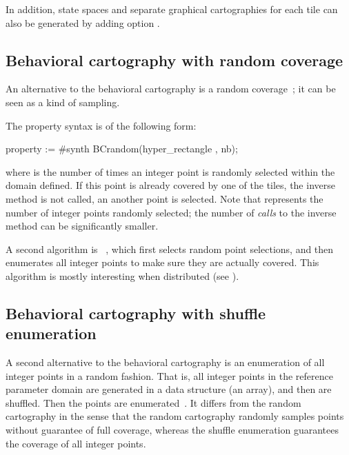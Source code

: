 In addition, state spaces and separate graphical cartographies for each tile can also be generated by adding option .


\subsection*{Behavioral cartography with random coverage}\label{section:algorithm:BC:random}

An alternative to the behavioral cartography is a random coverage~\cite{AF10}; it can be seen as a kind of sampling.

The property syntax is of the following form:

\begin{IMITATORproperty}
property := #synth BCrandom(hyper_rectangle , nb);
\end{IMITATORproperty}


\noindent{}where  is the number of times an integer point is randomly selected within the domain defined.
If this point is already covered by one of the tiles, the inverse method is not called, an another point is selected.
Note that  represents the number of integer points randomly selected; the number of \emph{calls} to the inverse method can be significantly smaller.

A second algorithm is ~\cite{ACE14}, which first selects random point selections, and then enumerates all integer points to make sure they are actually covered.
This algorithm is mostly interesting when distributed (see \cite{ACE14,ACN15}).


\subsection*{Behavioral cartography with shuffle enumeration}\label{section:algorithm:BC:shuffle}

A second alternative to the behavioral cartography is an enumeration of all integer points in a random fashion.
That is, all integer points in the reference parameter domain are generated in a data structure (an array), and then are shuffled.
Then the points are enumerated~\cite{ACN15}.
It differs from the random cartography in the sense that the random cartography randomly samples points without guarantee of full coverage, whereas the shuffle enumeration guarantees the coverage of all integer points.

